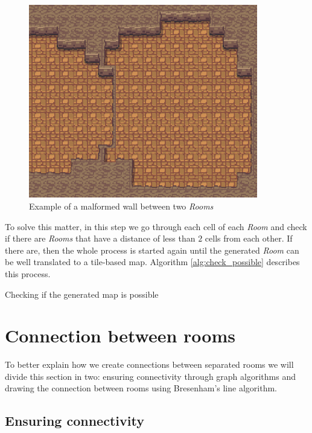 \begin{figure}[h]
    \caption{Example of a malformed wall between two \emph{Rooms}}
    \centerline{\includegraphics[width=10cm]{images/development/deformed_wall.png}}
    \label{fig:malformed_wall}
\end{figure}

To solve this matter, in this step we go through each cell of each \emph{Room} and check if there are \emph{Rooms} that have a distance of less than \(2\) cells from each other. If there are, then the whole process is started again until the generated \emph{Room} can be well translated to a tile-based map. Algorithm \ref{alg:check_possible} describes this process.

\begin{algorithm}[h]
 \DontPrintSemicolon
 \caption{Checking if the generated map is possible}
\label{alg:check_possible}
\end{algorithm} 

\section{Connection between rooms}
\label{sec:connection}

To better explain how we create connections between separated rooms we will divide this section in two: ensuring connectivity through graph algorithms and drawing the connection between rooms using Bresenham's line algorithm.

\subsection{Ensuring connectivity}

